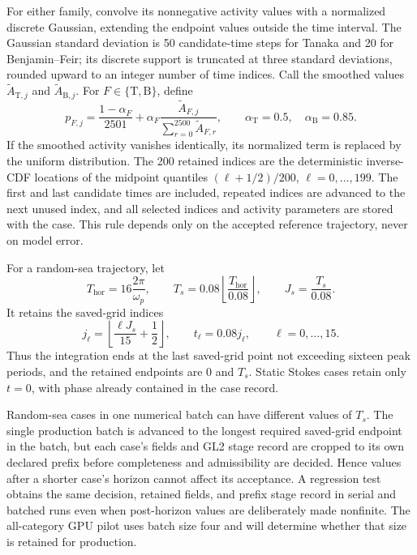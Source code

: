 \documentclass[11pt]{article}
\begin{document}
For either family, convolve its nonnegative activity values with a normalized
discrete Gaussian, extending the endpoint values outside the time interval.
The Gaussian standard deviation is 50 candidate-time steps for Tanaka and 20
for Benjamin--Feir; its discrete support is truncated at three standard
deviations, rounded upward to an integer number of time indices.  Call the smoothed values
$\widetilde A_{\mathrm T,j}$ and $\widetilde A_{\mathrm B,j}$.  For
$F\in\{\mathrm T,\mathrm B\}$, define
\begin{equation}
  p_{F,j}=\frac{1-\alpha_F}{2501}
    +\alpha_F\frac{\widetilde A_{F,j}}
      {\sum_{r=0}^{2500}\widetilde A_{F,r}},
  \qquad
  \alpha_{\mathrm T}=0.5,\quad \alpha_{\mathrm B}=0.85.
  \label{eq:adaptive-time-density}
\end{equation}
If the smoothed activity vanishes identically, its normalized term is replaced
by the uniform distribution.  The 200 retained indices are the deterministic
inverse-CDF locations of the midpoint quantiles
$(\ell+1/2)/200$, $\ell=0,\ldots,199$.  The first and last candidate times are
included, repeated indices are advanced to the next unused index, and all
selected indices and activity parameters are stored with the case.  This rule
depends only on the accepted reference trajectory, never on model error.

For a random-sea trajectory, let
\[
  T_{\mathrm{hor}}=16\frac{2\pi}{\omega_p},
  \qquad
  T_s=0.08\left\lfloor\frac{T_{\mathrm{hor}}}{0.08}\right\rfloor,
  \qquad
  J_s=\frac{T_s}{0.08}.
\]
It retains the saved-grid indices
\[
  j_\ell=\left\lfloor\frac{\ell J_s}{15}+\frac12\right\rfloor,
  \qquad
  t_\ell=0.08j_\ell,
  \qquad \ell=0,\ldots,15.
\]
Thus the integration ends at the last saved-grid point not exceeding sixteen
peak periods, and the retained endpoints are $0$ and $T_s$.  Static Stokes
cases retain only $t=0$, with phase already contained in the case record.

Random-sea cases in one numerical batch can have different values of $T_s$.
The single production batch is advanced to the longest required saved-grid
endpoint in the batch, but each case's fields and GL2 stage record are cropped
to its own declared prefix before completeness and admissibility are decided.
Hence values after a shorter case's horizon cannot affect its acceptance.  A
regression test obtains the same decision, retained fields, and prefix stage
record in serial and batched runs even when post-horizon values are
deliberately made nonfinite.  The all-category GPU pilot uses batch size four and
will determine whether that size is retained for production.
\end{document}
